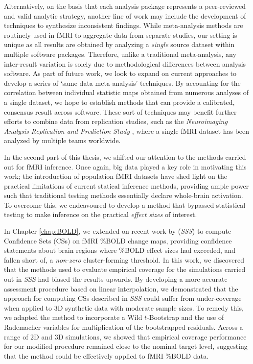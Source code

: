 Alternatively, on the basis that each analysis package represents a peer-reviewed and valid analytic strategy, another line of work may include the development of techniques to synthesize inconsistent findings. While meta-analysis methods are routinely used in fMRI to aggregate data from separate studies, our setting is unique as all results are obtained by analyzing a \textit{single} source dataset within multiple software packages. Therefore, unlike a traditional meta-analysis, any inter-result variation is solely due to methodological differences between analysis software. As part of future work, we look to expand on current approaches to develop a series of `same-data meta-analysis' techniques. By accounting for the correlation between individual statistic maps obtained from numerous analyses of a single dataset, we hope to establish methods that can provide a calibrated, consensus result across software. These sort of techniques may benefit further efforts to combine data from replication studies, such as the \textit{Neuroimaging Analysis Replication and Prediction Study} \citep{Botvinik-Nezer2019-qu}, where a single fMRI dataset has been analyzed by multiple teams worldwide. 

In the second part of this thesis, we shifted our attention to the methods carried out for fMRI inference. Once again, big data played a key role in motivating this work; the introduction of population fMRI datasets have shed light on the practical limitations of current statical inference methods, providing ample power such that traditional testing methods essentially declare whole-brain activation. To overcome this, we endeavoured to develop a method that bypassed statistical testing to make inference on the practical \textit{effect sizes} of interest.

In Chapter \ref{chap:BOLD}, we extended on recent work by \citet*{Sommerfeld2018-zl} (\textit{SSS}) to compute Confidence Sets (CSs) on fMRI \%BOLD change maps, providing confidence statements about brain regions where \%BOLD effect sizes had exceeded, and fallen short of, a \textit{non-zero} cluster-forming threshold. In this work, we discovered that the methods used to evaluate empirical coverage for the simulations carried out in \textit{SSS} had biased the results upwards. By developing a more accurate assessment procedure based on linear interpolation, we demonstrated that the approach for computing CSs described in \textit{SSS} could suffer from under-coverage when applied to 3D synthetic data with moderate sample sizes. To remedy this, we adapted the method to incorporate a Wild $t$-Bootstrap and the use of Rademacher variables for multiplication of the bootstrapped residuals. Across a range of 2D and 3D simulations, we showed that empirical coverage performance for our modified procedure remained close to the nominal target level, suggesting that the method could be effectively applied to fMRI \%BOLD data.

